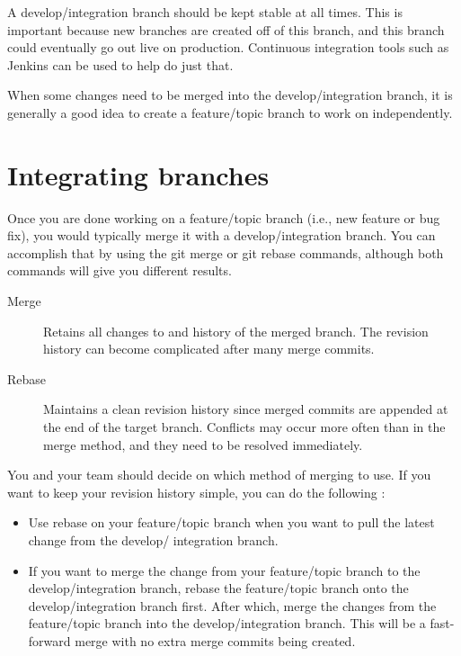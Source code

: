 \documentclass[10pt,a4paper,english]{report}
\begin{document}
    A develop/integration branch should be kept stable at all times. This is important because new branches are created off of this branch, and this branch could eventually go out live on production. Continuous integration tools such as Jenkins can be used to help do just that.

    When some changes need to be merged into the develop/integration branch, it is generally a good idea to create a feature/topic branch to work on independently.

\chapter{Integrating branches}
    \label{chap:integrating-branches}

    Once you are done working on a feature/topic branch (i.e., new feature or bug fix), you would typically merge it with a develop/integration branch. You can accomplish that by using the git merge or git rebase commands, although both commands will give you different results.

    \begin{description}
        \item[Merge] Retains all changes to and history of the merged branch. The revision history can become complicated after many merge commits.

        \item[Rebase] Maintains a clean revision history since merged commits are appended at the end of the target branch. Conflicts may occur more often than in the merge method, and they need to be resolved immediately.
    \end{description}

    You and your team should decide on which method of merging to use. If you want to keep your revision history simple, you can do the following :
    \begin{itemize}
        \item Use rebase on your feature/topic branch when you want to pull the latest change from the develop/ integration branch.
        \item If you want to merge the change from your feature/topic branch to the develop/integration branch, rebase the feature/topic branch onto the develop/integration branch first. After which, merge the changes from the feature/topic branch into the develop/integration branch. This will be a fast-forward merge with no extra merge commits being created.
    \end{itemize}
\end{document}
